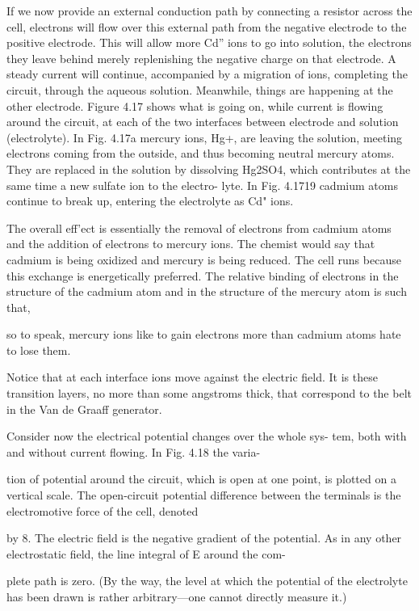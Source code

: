 If we now provide an external conduction path by connecting a
resistor across the cell, electrons will flow over this external path
from the negative electrode to the positive electrode. This will allow
more Cd'' ions to go into solution, the electrons they leave behind
merely replenishing the negative charge on that electrode. A steady
current will continue, accompanied by a migration of ions, completing
the circuit, through the aqueous solution. Meanwhile, things
are happening at the other electrode. Figure 4.17 shows what is
going on, while current is flowing around the circuit, at each of the
two interfaces between electrode and solution (electrolyte). In
Fig. 4.17a mercury ions, Hg+, are leaving the solution, meeting electrons
coming from the outside, and thus becoming neutral mercury
atoms. They are replaced in the solution by dissolving Hg2SO4,
which contributes at the same time a new sulfate ion to the electro-
lyte. In Fig. 4.1719 cadmium atoms continue to break up, entering
the electrolyte as Cd" ions.

The overall eff'ect is essentially the removal of electrons from cadmium
atoms and the addition of electrons to mercury ions. The
chemist would say that cadmium is being oxidized and mercury is
being reduced. The cell runs because this exchange is energetically
preferred. The relative binding of electrons in the structure of the
cadmium atom and in the structure of the mercury atom is such that,

so to speak, mercury ions like to gain electrons more than cadmium
atoms hate to lose them.

Notice that at each interface ions move against the electric field.
It is these transition layers, no more than some angstroms thick, that
correspond to the belt in the Van de Graaff generator.

Consider now the electrical potential changes over the whole sys-
tem, both with and without current flowing. In Fig. 4.18 the varia-

tion of potential around the circuit, which is open at one point, is
plotted on a vertical scale. The open-circuit potential difference
between the terminals is the electromotive force of the cell, denoted

by 8. The electric field is the negative gradient of the potential. As
in any other electrostatic field, the line integral of E around the com-

plete path is zero. (By the way, the level at which the potential of
the electrolyte has been drawn is rather arbitrary---one cannot
directly measure it.)

